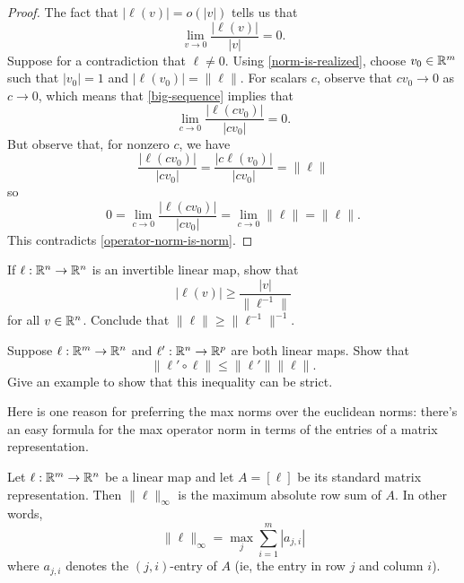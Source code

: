 \begin{proof}
The fact that $|\ell(v)| = o(|v|)$ tells us that
\begin{equation} \label{big-sequence} \lim_{v \to 0} \frac{|\ell(v)|}{|v|} = 0. \end{equation}
Suppose for a contradiction that $\ell \neq 0$. Using \cref{norm-is-realized}, choose $v_0 \in \mathbb{R}^m$ such that $|v_0| = 1$ and $|\ell(v_0)| = \|\ell\|$. For scalars $c$, observe that $cv_0 \to 0$ as $c \to 0$, which means that \cref{big-sequence} implies that
\[ \lim_{c \to 0} \frac{|\ell(cv_0)|}{|cv_0|} = 0.  \]
But observe that, for nonzero $c$, we have
\[ \frac{|\ell(cv_0)|}{|cv_0|} = \frac{|c\ell(v_0)|}{|cv_0|} = \|\ell\| \]
so
\[ 0 = \lim_{c \to 0} \frac{|\ell(cv_0)|}{|cv_0|} = \lim_{c \to 0} \|\ell\| = \|\ell\|. \]
This contradicts \cref{operator-norm-is-norm}. 
\end{proof}

\begin{exercise} \label{operator-norm-inverse}
	If $\ell : \mathbb{R}^n \to \mathbb{R}^n$ is an invertible linear map, show that
	\[ |\ell(v)| \geq \frac{|v|}{\|\ell^{-1}\|} \]
	for all $v \in \mathbb{R}^n$. Conclude that $\|\ell\| \geq \|\ell^{-1}\|^{-1}$. 
\end{exercise}

\begin{exercise}[Submultiplicativity] \label{operator-norm-submultiplicative} 
	Suppose $\ell : \mathbb{R}^m \to \mathbb{R}^n$ and $\ell' : \mathbb{R}^n \to \mathbb{R}^p$ are both linear maps. Show that \[ \|\ell' \circ \ell\| \leq \|\ell'\| \|\ell\|. \]
	Give an example to show that this inequality can be strict. 
\end{exercise}

Here is one reason for preferring the max norms over the euclidean norms: there's an easy formula for the max operator norm in terms of the entries of a matrix representation.

\begin{proposition} \label{max-operator-norm-characterization}
	Let $\ell : \mathbb{R}^m \to \mathbb{R}^n$ be a linear map and let $A = [\ell]$ be its standard matrix representation. Then $\|\ell\|_\infty$ is the maximum absolute row sum of $A$. In other words, 
	\[ \|\ell\|_\infty = \max_j \sum_{i = 1}^m |a_{j,i}| \]
	where $a_{j,i}$ denotes the $(j,i)$-entry of $A$ (ie, the entry in row $j$ and column $i$). 
\end{proposition}

